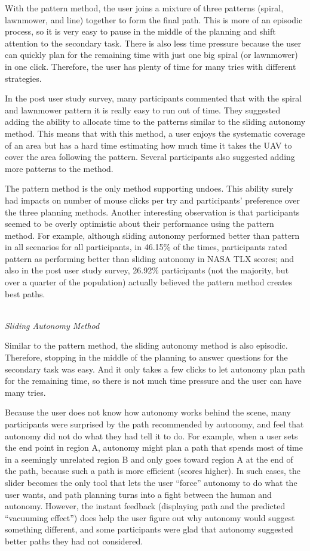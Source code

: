 With the pattern method, the user joins a mixture of three patterns (spiral, lawnmower, and line) together to form the final path. This is more of an episodic process, so it is very easy to pause in the middle of the planning and shift attention to the secondary task. There is also less time pressure because the user can quickly plan for the remaining time with just one big spiral (or lawnmower) in one click. Therefore, the user has plenty of time for many tries with different strategies.

In the post user study survey, many participants commented that with the spiral and lawnmower pattern it is really easy to run out of time. They suggested adding the ability to allocate time to the patterns similar to the sliding autonomy method. This means that with this method, a user enjoys the systematic coverage of an area but has a hard time estimating how much time it takes the UAV to cover the area following the pattern. Several participants also suggested adding more patterns to the method. 

The pattern method is the only method supporting undoes. This ability surely had impacts on number of mouse clicks per try and participants' preference over the three planning methods. Another interesting observation is that participants seemed to be overly optimistic about their performance using the pattern method. For example, although sliding autonomy performed better than pattern in all scenarios for all participants, in 46.15\% of the times, participants rated pattern as performing better than sliding autonomy in NASA TLX scores; and also in the post user study survey, 26.92\% participants (not the majority, but over a quarter of the population) actually believed the pattern method creates best paths.

~\\ \noindent \textit{Sliding Autonomy Method}

Similar to the pattern method, the sliding autonomy method is also episodic. Therefore, stopping in the middle of the planning to answer questions for the secondary task was easy. And it only takes a few clicks to let autonomy plan path for the remaining time, so there is not much time pressure and the user can have many tries. 

Because the user does not know how autonomy works behind the scene, many participants were surprised by the path recommended by autonomy, and feel that autonomy did not do what they had tell it to do. For example, when a user sets the end point in region A, autonomy might plan a path that spends most of time in a seemingly unrelated region B and only goes toward region A at the end of the path, because such a path is more efficient (scores higher). In such cases, the slider becomes the only tool that lets the user ``force'' autonomy to do what the user wants, and path planning turns into a fight between the human and autonomy. However, the instant feedback (displaying path and the predicted ``vacuuming effect'') does help the user figure out why autonomy would suggest something different, and some participants were glad that autonomy suggested better paths they had not considered. 

